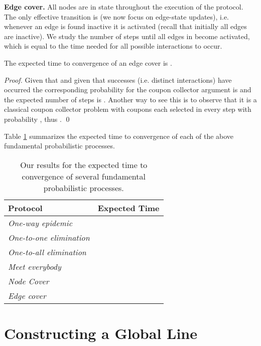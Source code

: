 \documentclass[oribibl, 11pt]{llncs}
\begin{document}
\noindent\textbf{Edge cover.} All nodes are in state  throughout the execution of the protocol. The only effective transition is  (we now focus on edge-state updates), i.e. whenever an edge is found inactive it is activated (recall that initially all edges are inactive). We study the number of steps until all edges in  become activated, which is equal to the time needed for all possible interactions to occur.

\begin{proposition} \label{pro:edge-cover}
The expected time to convergence of an edge cover is .
\end{proposition}
\begin{proof}
Given that  and given that  successes (i.e.  distinct interactions) have occurred the corresponding probability for the coupon collector argument is  and the expected number of steps is . Another way to see this is to observe that it is a classical coupon collector problem with  coupons each selected in every step with probability , thus .
\qed
\end{proof}

Table \ref{tab:basic-proc-full} summarizes the expected time to convergence of each of the above fundamental probabilistic processes.

\begin{table}[h]
\normalsize
\setlength{\tabcolsep}{15pt}
\begin{center}
\begin{tabular}{  l  c  }
  \hline
  Protocol & Expected Time \\ \hline
  \emph{One-way epidemic} &  \\ 
  \emph{One-to-one elimination} &  \\ 
  \emph{One-to-all elimination} &  \\ 
  \emph{Meet everybody} &  \\
  \emph{Node Cover} &  \\ 
  \emph{Edge cover} &  \\ \hline
\end{tabular}
\end{center}
\caption{Our results for the expected time to convergence of several fundamental probabilistic processes.} \label{tab:basic-proc-full}
\end{table}

\section{Constructing a Global Line}
\label{sec:global-line}
\end{document}

